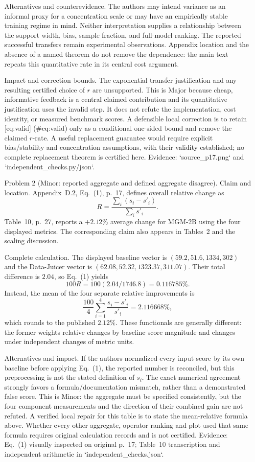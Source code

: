 \documentclass[10pt]{article}
\begin{document}
Alternatives and counterevidence. The authors may intend variance as an informal proxy for a concentration scale or may have an empirically stable training regime in mind. Neither interpretation supplies a relationship between the support width, bias, sample fraction, and full-model ranking. The reported successful transfers remain experimental observations. Appendix location and the absence of a named theorem do not remove the dependence: the main text repeats this quantitative rate in its central cost argument.\par
Impact and correction bounds. The exponential transfer justification and any resulting certified choice of \(r\) are unsupported. This is Major because cheap, informative feedback is a central claimed contribution and its quantitative justification uses the invalid step. It does not refute the implementation, cost identity, or measured benchmark scores. A defensible local correction is to retain [eq:valid] (\#eq:valid) only as a conditional one-sided bound and remove the claimed \(r\)-rate. A useful replacement guarantee would require explicit bias/stability and concentration assumptions, with their validity established; no complete replacement theorem is certified here. Evidence: `source\_p17.png` and `independent\_checks.py/json`.\par
Problem 2 (Minor: reported aggregate and defined aggregate disagree).  Claim and location. Appendix D.2, Eq. (1), p. 17, defines overall relative change as \[R=\frac{\sum_i(s_i-s'_i)}{\sum_i s'_i}.\] Table 10, p. 27, reports a \(+2.12\%\) average change for MGM-2B using the four displayed metrics. The corresponding claim also appears in Tables 2 and the scaling discussion.\par
Complete calculation. The displayed baseline vector is \((59.2,51.6,1334,302)\) and the Data-Juicer vector is \((62.08,52.32,1323.37,311.07)\). Their total difference is \(2.04\), so Eq. (1) yields \[100R=100(2.04/1746.8)=0.116785\%.\] Instead, the mean of the four separate relative improvements is \[\frac{100}{4}\sum_{i=1}^{4}\frac{s_i-s'_i}{s'_i}
 =2.116668\%,\] which rounds to the published \(2.12\%\). These functionals are generally different: the former weights relative changes by baseline score magnitude and changes under independent changes of metric units.\par
Alternatives and impact. If the authors normalized every input score by its own baseline before applying Eq. (1), the reported number is reconciled, but this preprocessing is not the stated definition of \(s_i\). The exact numerical agreement strongly favors a formula/documentation mismatch, rather than a demonstrated false score. This is Minor: the aggregate must be specified consistently, but the four component measurements and the direction of their combined gain are not refuted. A verified local repair for this table is to state the mean-relative formula above. Whether every other aggregate, operator ranking and plot used that same formula requires original calculation records and is not certified. Evidence: Eq. (1) visually inspected on original p. 17; Table 10 transcription and independent arithmetic in `independent\_checks.json`.\par
\end{document}
